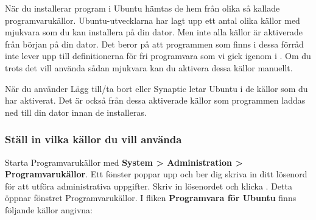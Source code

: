 \documentclass[a4paper,final]{memoir} %
\begin{document}

När du installerar program i Ubuntu hämtas de hem från olika så kallade programvarukällor. Ubuntu-utvecklarna har lagt upp ett antal olika källor med mjukvara som du kan installera på din dator. Men inte alla källor är aktiverade från början på din dator. Det beror på att programmen som finns i dessa förråd inte lever upp till definitionerna för fri programvara som vi gick igenom i . Om du trots det vill använda sådan mjukvara kan du aktivera dessa källor manuellt.

När du använder Lägg till/ta bort eller Synaptic letar Ubuntu i de källor som du har aktiverat. Det är också från dessa aktiverade källor som programmen laddas ned till din dator innan de installeras.

\subsubsection{Ställ in vilka källor du vill använda}

Starta Programvarukällor med \textbf{System \textgreater{} Administration \textgreater{} Programvarukällor}. Ett fönster poppar upp och ber dig skriva in ditt lösenord för att utföra administrativa uppgifter. Skriv in lösenordet och klicka \xok{}. Detta öppnar fönstret Programvarukällor. I fliken \textbf{Programvara för Ubuntu} finns följande källor angivna:
\end{document}
